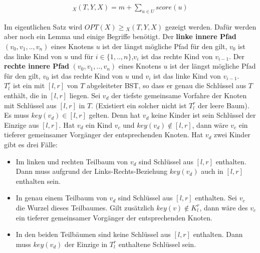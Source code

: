\documentclass[a4paper,12pt]{article}
\begin{document}
\begin{align*}
_X(T, Y, X)  = m + \sum_{u \in U} {\mathit{score}} \left(u\right)
\end{align*} %

\noindent Im eigentlichen Satz wird $\mathit{OPT}\left(X\right) \geq {_X(T, Y, X)} $ gezeigt werden. Dafür werden aber noch ein Lemma und einige Begriffe benötigt. Der \textbf{linke innere Pfad} $\left(v_0,v_1,..,v_n \right)$ eines Knotens $u$ ist der längst mögliche Pfad für den gilt, $v_0$ ist das linke Kind von $u$ und für $i \in \{1,..,n\}$,$v_i$ ist das rechte Kind von $v_{i-1}$. Der \textbf{rechte innere Pfad} $\left(v_0,v_1,..,v_n \right)$ eines Knotens $u$ ist der längst mögliche Pfad für den gilt, $v_0$ ist das rechte Kind von $u$ und $v_i$ ist das linke Kind von $v_{i-1}$.\\ $T^r_l$ ist ein mit $\left[l,r\right]$ von $T$ abgeleiteter BST, so dass er genau die Schlüssel aus $T$ enthält, die in $\left[l, r\right]$ liegen. Sei $v_d$ der tiefste gemeinsame Vorfahre der Knoten mit Schlüssel aus  $\left[l,r\right]$ in $T$. (Existiert ein solcher nicht ist $T^r_l$ der leere Baum). Es muss $\mathit{key}(v_d) \in \left[l,r\right]$ gelten. Denn hat $v_d$ keine Kinder ist sein Schlüssel der Einzige aus $\left[l,r\right]$. Hat $v_d$ ein Kind $v_{c}$ und $\mathit{key}(v_d) \notin \left[l,r\right]$, dann wäre $v_{c}$ ein tieferer gemeinsamer Vorgänger der entsprechenden Knoten. Hat $v_d$ zwei Kinder gibt es drei Fälle:
\begin{itemize}
	\item Im linken und rechten Teilbaum von $v_d$ sind Schlüssel aus $\left[l,r\right]$ enthalten. Dann muss aufgrund der Links-Rechts-Beziehung  $\mathit{key}(v_d)$ auch in $\left[l,r\right]$ enthalten sein.
	\item In genau einem Teilbaum von $v_d$ sind Schlüssel aus $\left[l,r\right]$ enthalten. Sei $v_{c}$ die Wurzel dieses Teilbaumes. Gilt zusätzlich $\mathit{key}(v) \notin K^r_l$, dann wäre des  $v_c$ ein tieferer gemeinsamer Vorgänger der entsprechenden Knoten.
	\item In den beiden Teilbäumen sind keine Schlüssel aus $\left[l,r\right]$ enthalten.  Dann muss $\mathit{key}(v_d)$ der Einzige in $T^r_l$ enthaltene Schlüssel sein.
\end{itemize}
\end{document}
